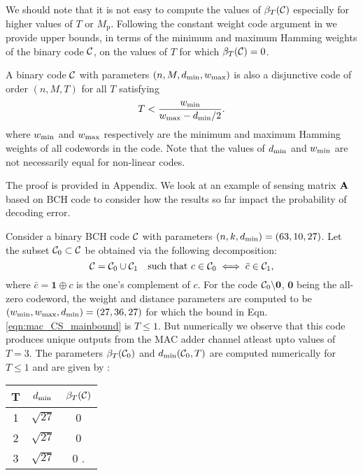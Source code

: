 We should note that it is not easy to compute the values of $\beta_T(\mathcal{C})$ especially for higher values of $T$ or $M_\mathrm{p}$. Following the constant weight code argument in \cite{fan1995superimposed} we provide upper bounds, in terms of the minimum and maximum Hamming weights of the binary code $\mathcal{C}$, on the values of $T$ for which $\beta_T(\mathcal{C})=0$.
\begin{lemma}
A binary code $\mathcal{C}$ with parameters $(n,M,d_{\mathrm{min}},w_{\text{max}})$ is also a disjunctive code of order $(n,M,T)$ for all $T$ satisfying
\begin{align}
T<\frac{w_{\text{min}}}{w_{\text{max}}-d_{\mathrm{min}}/2}.
\label{eqn:mac_CS_mainbound}
\end{align}
where $w_{\text{min}}$ and $w_{\text{max}}$ respectively are the minimum and maximum Hamming weights of all codewords in the code. Note that the values of $d_{\mathrm{min}}$ and $w_{\text{min}}$ are not necessarily equal for non-linear codes.
\label{lem:mac_CS_mainbound}
\end{lemma}
The proof is provided in Appendix. We look at an example of sensing matrix $\mathbf{A}$ based on BCH code to consider how the results so far impact the probability of decoding error.
\begin{example}
Consider a binary BCH code $\mathcal{C}$ with parameters $(n,k,d_{\mathrm{min}})=(63,10,27)$. Let the subset $\mathcal{C}_0\subset \mathcal{C}$ be obtained via the following decomposition:
\[
\mathcal{C}=\mathcal{C}_0 \cup \mathcal{C}_1 ~~\text{ such that } c\in \mathcal{C}_0 \iff \bar{c}\in\mathcal{C}_1,
\]
where $\bar{c}=\mathbf{1}\oplus c$ is the one's complement of $c$. For the code $\mathcal{C}_0\backslash \mathbf{0}$, $\mathbf{0}$ being the all-zero codeword, the weight and distance parameters are computed to be $(w_{\text{min}},w_{\text{max}},d_{\mathrm{min}})=(27,36,27)$ for which the bound in Eqn. \eqref{eqn:mac_CS_mainbound} is $T\leq 1$. But numerically we observe that this code produces unique outputs from the MAC adder channel atleast upto values of $T=3$. The parameters $\beta_T(\mathcal{C}_0)$ and $d_{\mathrm{min}}(\mathcal{C}_0,T)$ are computed numerically for $T\leq 1$ and are given by :
\begin{center}
\begin{tabular}{ c c c }
T  &  $d_{\mathrm{min}}$& $\beta_T(\mathcal{C})$\\
\hline\hline
1	&	$\sqrt{27}$	& 0\\
2	& $\sqrt{27}$ & 0\\
3  &  $\sqrt{27}$& 0 .
\end{tabular}
\end{center}
\label{Ex:BCH_halfcode}
\end{example}
\fi

